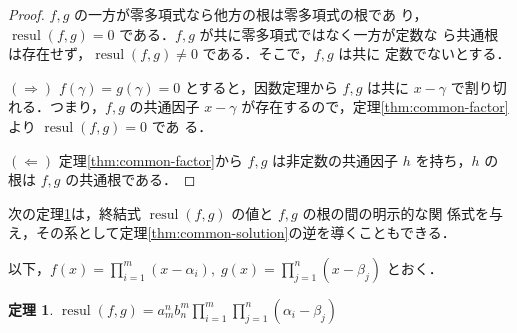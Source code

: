 \documentclass[12pt, uplatex, dvipdfmx]{jsarticle}
\newcommand{\ds}{\displaystyle}
\theoremstyle{definition}
\newtheorem{theorem}{定理}
\DeclareMathOperator{\resul}{resul}
\begin{document}
\begin{proof} $f,g$ の一方が零多項式なら他方の根は零多項式の根であ
  り，$\resul(f,g)=0$ である．$f,g$ が共に零多項式ではなく一方が定数な
  ら共通根は存在せず，$\resul(f,g) \neq 0$ である．そこで，$f,g$ は共に
  定数でないとする．

  $(\Rightarrow)$ $f(\gamma)=g(\gamma)=0$ とすると，因数定理から $f,g$
  は共に $x-\gamma$ で割り切れる．つまり，$f,g$ の共通因子 $x-\gamma$
  が存在するので，定理\ref{thm:common-factor}より $\resul(f,g)=0$ であ
  る．
  
  $(\Leftarrow)$ 定理\ref{thm:common-factor}から $f,g$ は非定数の共通因子 $h$
  を持ち，$h$ の根は $f,g$ の共通根である．
\end{proof}

次の定理\ref{thm:solutions}は，終結式 $\resul(f,g)$ の値と $f,g$ の根の間の明示的な関
係式を与え，その系として定理\ref{thm:common-solution}の逆を導くこともできる．

\newpage

以下，$\ds f(x) = \prod_{i=1}^{m}(x-\alpha_i), \; g(x) = \prod_{j=1}^{n}(x-\beta_j)$ とおく．

\begin{theorem}\label{thm:solutions}
  $\ds \resul(f,g) =  a_m^n b_n^m \prod_{i=1}^{m} \prod_{j=1}^{n} (\alpha_i-\beta_j)$
\end{theorem}
\end{document}
